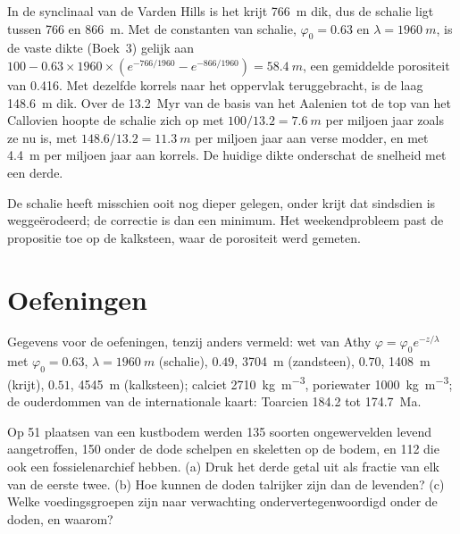 \begin{example}\label{ex:b2:palaeoenvironments:shale}
In de synclinaal van de Varden Hills is het krijt \qty{766}{m} dik, dus de schalie ligt tussen
766 en \qty{866}{m}. Met de constanten van schalie, $\varphi_0 = 0.63$ en $\lambda =
\qty{1960}{m}$, is de vaste dikte (Boek~3) gelijk aan $100 - 0.63 \times 1960 \times
(e^{-766/1960} - e^{-866/1960}) = \qty{58.4}{m}$, een gemiddelde porositeit van 0.416. Met dezelfde korrels naar het
oppervlak teruggebracht, is de laag \qty{148.6}{m} dik. Over de \qty{13.2}{Myr} van
de basis van het Aalenien tot de top van het Callovien hoopte de schalie zich op met $100/13.2 =
\qty{7.6}{m}$ per miljoen jaar zoals ze nu is, met $148.6/13.2 = \qty{11.3}{m}$ per miljoen
jaar aan verse modder, en met \qty{4.4}{m} per miljoen jaar aan korrels. De huidige dikte
onderschat de snelheid met een derde.
\end{example}

De schalie heeft misschien ooit nog dieper gelegen, onder krijt dat sindsdien is weggeërodeerd; de correctie is dan een
minimum. Het weekendprobleem past de propositie toe op de kalksteen, waar de porositeit werd
gemeten.

\section*{Oefeningen}\label{sec:b2:palaeoenvironments:exercises}

Gegevens voor de oefeningen, tenzij anders vermeld: wet van Athy $\varphi = \varphi_0 e^{-z/\lambda}$
met $\varphi_0 = 0.63$, $\lambda = \qty{1960}{m}$ (schalie), $0.49$, \qty{3704}{m} (zandsteen),
$0.70$, \qty{1408}{m} (krijt), $0.51$, \qty{4545}{m} (kalksteen); calciet \qty{2710}{kg.m^{-3}},
poriewater \qty{1000}{kg.m^{-3}}; de ouderdommen van de internationale kaart: Toarcien 184.2 tot
\qty{174.7}{Ma}.

\begin{exercise}[$\star$]\label{exo:b2:palaeoenvironments:1}
Op 51 plaatsen van een kustbodem werden 135 soorten ongewervelden levend aangetroffen, 150 onder de dode
schelpen en skeletten op de bodem, en 112 die ook een fossielenarchief hebben. (a) Druk het derde
getal uit als fractie van elk van de eerste twee. (b) Hoe kunnen de doden talrijker zijn dan de levenden? (c)
Welke voedingsgroepen zijn naar verwachting ondervertegenwoordigd onder de doden, en waarom?
\end{exercise}

